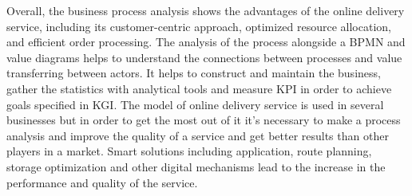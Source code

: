 Overall, the business process analysis shows the advantages of the online delivery service,
including its customer-centric approach, optimized resource allocation, and efficient order processing.
The analysis of the process alongside a BPMN and value diagrams helps to understand
the connections between processes and value transferring between actors.
It helps to construct and maintain the business, gather the statistics with analytical tools and measure KPI in order to achieve goals specified in KGI.
The model of online delivery service is used in several businesses but in order to get the most out of it it’s necessary
to make a process analysis and improve the quality of a service and get better results than other players in a market.
Smart solutions including application, route planning,
storage optimization and other digital mechanisms lead to the increase in the performance and quality of the service.
